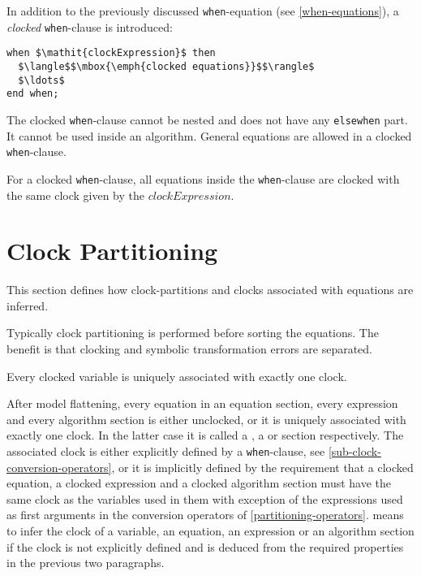 In addition to the previously discussed \lstinline!when!-equation (see \cref{when-equations}), a \emph{clocked} \lstinline!when!-clause is introduced:
\begin{lstlisting}[language=modelica]
when $\mathit{clockExpression}$ then
  $\langle$$\mbox{\emph{clocked equations}}$$\rangle$
  $\ldots$
end when;
\end{lstlisting}

The clocked \lstinline!when!-clause cannot be nested and does not have any \lstinline!elsewhen! part.
It cannot be used inside an algorithm.
General equations are allowed in a clocked \lstinline!when!-clause.

For a clocked \lstinline!when!-clause, all equations inside the \lstinline!when!-clause are clocked with the same clock given by the $\mathit{clockExpression}$.

\section{Clock Partitioning}\label{clock-partitioning}

This section defines how clock-partitions and clocks associated with
equations are inferred.

\begin{nonnormative}
Typically clock partitioning is performed before sorting the equations.
The benefit is that clocking and symbolic transformation errors are separated.
\end{nonnormative}

Every clocked variable is uniquely associated with exactly one clock.

After model flattening, every equation in an equation section, every expression and every algorithm section is either unclocked, or it is uniquely associated with exactly one clock.
In the latter case it is called a , a  or  section respectively.
The associated clock is either explicitly defined by a \lstinline!when!-clause, see \cref{sub-clock-conversion-operators}, or it is implicitly defined by the requirement that a clocked equation, a clocked expression and a clocked algorithm section must have the same clock as the variables used in them with exception of the expressions used as first arguments in the conversion operators of \cref{partitioning-operators}.
 means to infer the clock of a variable, an equation, an expression or an algorithm section if the clock is not explicitly defined and is deduced from the required properties in the previous two paragraphs.

